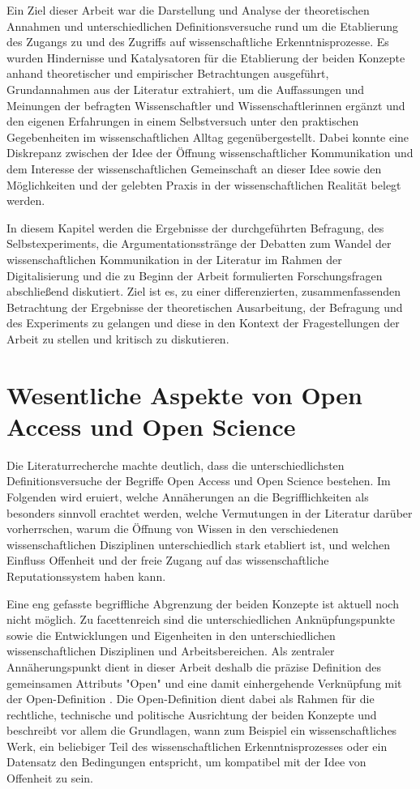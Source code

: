 Ein Ziel dieser Arbeit war die Darstellung und Analyse der theoretischen Annahmen und unterschiedlichen Definitionsversuche rund um die Etablierung des Zugangs zu und des Zugriffs auf wissenschaftliche Erkenntnisprozesse. Es wurden Hindernisse und Katalysatoren für die Etablierung der beiden Konzepte anhand theoretischer und empirischer Betrachtungen ausgeführt, Grundannahmen aus der Literatur extrahiert, um die Auffassungen und Meinungen der befragten Wissenschaftler und Wissenschaftlerinnen ergänzt und den eigenen Erfahrungen in einem Selbstversuch unter den praktischen Gegebenheiten im wissenschaftlichen Alltag gegenübergestellt. Dabei konnte eine Diskrepanz zwischen der Idee der Öffnung wissenschaftlicher Kommunikation und dem Interesse der wissenschaftlichen Gemeinschaft an dieser Idee sowie den Möglichkeiten und der gelebten Praxis in der wissenschaftlichen Realität belegt werden.

In diesem Kapitel werden die Ergebnisse der durchgeführten Befragung, des Selbstexperiments, die Argumentationsstränge der Debatten zum Wandel der wissenschaftlichen Kommunikation in der Literatur im Rahmen der Digitalisierung und die zu Beginn der Arbeit formulierten Forschungsfragen abschließend diskutiert. Ziel ist es, zu einer differenzierten, zusammenfassenden Betrachtung der Ergebnisse der theoretischen Ausarbeitung, der Befragung und des Experiments zu gelangen und diese in den Kontext der Fragestellungen der Arbeit zu stellen und kritisch zu diskutieren.

\section{Wesentliche Aspekte von Open Access und Open Science}

Die Literaturrecherche machte deutlich, dass die unterschiedlichsten Definitionsversuche der Begriffe Open Access und Open Science bestehen. Im Folgenden wird eruiert, welche Annäherungen an die Begrifflichkeiten als besonders sinnvoll erachtet werden, welche Vermutungen in der Literatur darüber vorherrschen, warum die Öffnung von Wissen in den verschiedenen wissenschaftlichen Disziplinen unterschiedlich stark etabliert ist, und welchen Einfluss Offenheit und der freie Zugang auf das wissenschaftliche Reputationssystem haben kann.

Eine eng gefasste begriffliche Abgrenzung der beiden Konzepte ist aktuell noch nicht möglich. Zu facettenreich sind die unterschiedlichen Anknüpfungspunkte sowie die Entwicklungen und Eigenheiten in den unterschiedlichen wissenschaftlichen Disziplinen und Arbeitsbereichen. Als zentraler Annäherungspunkt dient in dieser Arbeit deshalb die präzise Definition des gemeinsamen Attributs "Open" und eine damit einhergehende Verknüpfung mit der Open-Definition \cite{Open_Definition_2014}. Die Open-Definition dient dabei als Rahmen für die rechtliche, technische und politische Ausrichtung der beiden Konzepte und beschreibt vor allem die Grundlagen, wann zum Beispiel ein wissenschaftliches Werk, ein beliebiger Teil des wissenschaftlichen Erkenntnisprozesses oder ein Datensatz den Bedingungen entspricht, um kompatibel mit der Idee von Offenheit zu sein.

